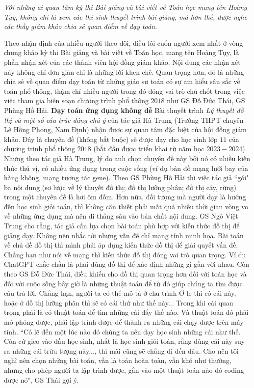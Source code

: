 \textit{Với những ai quan tâm kỳ thi Bài giảng và bài viết về Toán học mang tên Hoàng Tụy, không chỉ là xem các thí sinh thuyết trình bài giảng, mà hơn thế, được nghe các thầy giám khảo chia sẻ quan điểm về dạy toán.}

\begin{multicols}{2}
	Theo nhận định của nhiều người theo dõi, điều lôi cuốn người xem nhất ở vòng chung khảo kỳ thi Bài giảng và bài viết về Toán học, mang tên Hoàng Tụy, là phần nhận xét của các thành viên hội đồng giám khảo. Nội dung các nhận xét này không chỉ đơn giản chỉ là những lời khen chê. Quan trọng hơn, đó là những chia sẻ về quan điểm dạy toán từ những giáo sư toán có sự am hiểu sâu sắc về toán phổ thông, thậm chí nhiều người trong đó đóng vai trò chủ chốt trong việc việc tham gia biên soạn chương trình phổ thông $2018$ như GS Đỗ Đức Thái, GS Phùng Hồ Hải. 
	\vskip 0.1cm
	\textbf{\color{diendantoanhoc}Dạy toán ứng dụng không dễ}
	\vskip 0.1cm
	Bài thuyết trình \textit{Lý thuyết đồ thị và một số cấu trúc đáng chú ý} của tác giả Hà Trung (Trường THPT chuyên Lê Hồng Phong, Nam Định) nhận được sự quan tâm đặc biệt của hội đồng giám khảo. Đây là chuyên đề (không bắt buộc) sẽ được dạy cho học sinh lớp $11$ của chương trình phổ thông $2018$ (bắt đầu được triển khai từ năm học $2023-2024$). Nhưng theo tác giả Hà Trung, lý do anh chọn chuyên đề này bởi nó có nhiều kiến thức thú vị, có nhiều ứng dụng trong cuộc sống (ví dụ bản đồ mạng lưới bay của hàng không, mạng tương tác gene). 
	\vskip 0.1cm
	Theo GS Phùng Hồ Hải thì việc tác giả ``gói" ba nội dung (sơ lược về lý thuyết đồ thị; đồ thị lưỡng phân; đồ thị cây, rừng) trong một chuyên đề là hơi ôm đồm. Hơn nữa, đối tượng mà người dạy là hướng đến học sinh giỏi toán, thì không cần thiết phải mất quá nhiều thời gian vòng vo về những ứng dụng mà nên đi thẳng sâu vào bản chất nội dung. 
	\vskip 0.1cm
	GS Ngô Việt Trung cho rằng, tác giả cần lựa chọn bài toán phù hợp với kiến thức đồ thị để giảng dạy. Không nên nhắc tới những vấn đề chỉ mang tính minh họa. Bài toán về chủ đề đồ thị thì mình phải áp dụng kiến thức đồ thị để giải quyết vấn đề. Chẳng hạn như nói về mạng thì kiến thức đồ thị đóng vai trò quan trọng. Ví dụ ChatGPT chắc chắn là phải dùng đồ thị để xác định những gì gắn với nhau. 
	\vskip 0.1cm
	Còn theo GS Đỗ Đức Thái, điều khiến cho đồ thị quan trọng hơn đối với toán học và đối với cuộc sống bây giờ là những thuật toán để từ đó giúp chúng ta tìm được câu trả lời. Chẳng hạn, người ta có thể mô tả  ở chu trình Ơ le thì có cái này, hoặc ở đồ thị lưỡng phân thì sẽ có cái thứ như thế này... Trong khi cái quan trọng phải là có thuật toán để tìm những cái đấy thế nào. Và thuật toán đó phải mô phỏng được, phải lập trình được để thành ra những cái chạy được trên máy tính. ``Có lẽ đến một lúc nào đó chúng ta nên dạy học sinh những cái như thế. Còn cứ gieo vào đầu học sinh, nhất là học sinh giỏi toán, rằng dùng cái này suy ra những cái trừu tượng này..., thì mãi cũng sẽ chẳng đi đến đâu. Cho nên tôi nghĩ nên chọn những bài toán, vẫn là toán hoàn toàn, vẫn khó như thường, nhưng cho phép người ta lập trình được, gắn vào một thuật toán nào đó coding được nó", GS Thái gợi ý. 

\end{multicols}
